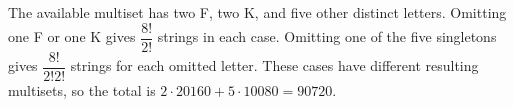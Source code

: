 The available multiset has two F, two K, and five other distinct letters. Omitting one F or one K gives $\dfrac{8!}{2!}$ strings in each case. Omitting one of the five singletons gives $\dfrac{8!}{2!2!}$ strings for each omitted letter. These cases have different resulting multisets, so the total is $2\cdot20160+5\cdot10080=\boxed{90720}$.
